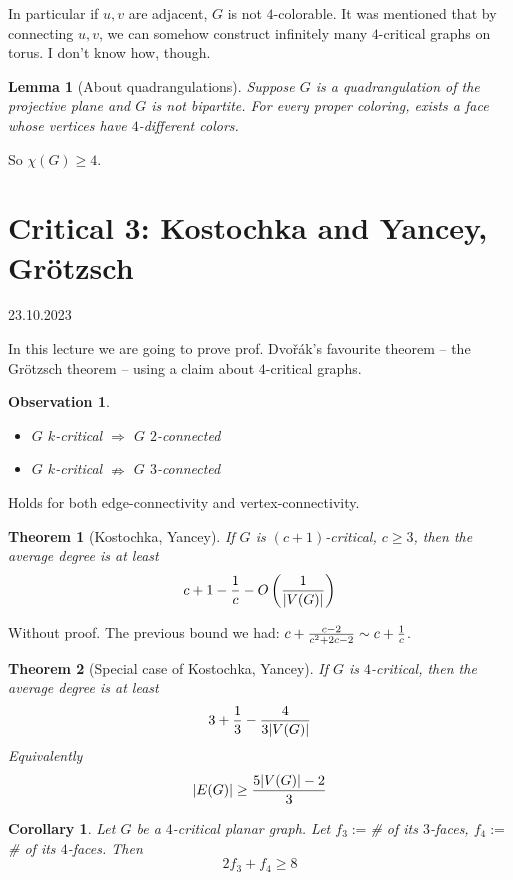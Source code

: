 \documentclass{article}
\newtheorem*{theorem}{Theorem}
\newtheorem*{lemma}{Lemma}
\newtheorem*{observation}{Observation}
\newtheorem*{corollary}{Corollary}
\begin{document}
\noindent
In particular if $u,v$ are adjacent, $G$ is not $4$-colorable. It was mentioned
that by connecting $u,v$, we can somehow construct infinitely many $4$-critical
graphs on torus. I don't know how, though.

\begin{lemma}[About quadrangulations]
	Suppose $G$ is a quadrangulation of the projective plane and $G$ is not
	bipartite. For every proper coloring, exists a face whose vertices have
	$4$-different colors.
\end{lemma}

\noindent
So $\chi(G) \ge 4$.


\newpage
\section{Critical 3: Kostochka and Yancey, Grötzsch} %
23.10.2023

\noindent
In this lecture we are going to prove prof. Dvořák's favourite theorem -- the
Grötzsch theorem -- using a claim about $4$-critical graphs.

\begin{observation}
	~
	\begin{itemize}
		\item $G$ $k$-critical $\Rightarrow$ $G$ $2$-connected
		\item $G$ $k$-critical $\nRightarrow$ $G$ $3$-connected
	\end{itemize}
\end{observation}

\noindent
Holds for both edge-connectivity and vertex-connectivity.

\begin{theorem}[Kostochka, Yancey]
	If $G$ is $(c+1)$-critical, $c \ge 3$, then the average degree is at
	least
	$$c + 1 - {1 \over c} - O \left ( {1 \over {|V(G)|}} \right )$$
\end{theorem}

\noindent
Without proof. The previous bound we had: $c + {{c-2}\over{c^2 + 2c - 2}} \sim
c + {1 \over c}$.

\begin{theorem}[Special case of Kostochka, Yancey]
	If $G$ is $4$-critical, then the average degree is at least
	$$ 3 + {1 \over 3} - {4 \over {3|V(G)|}} $$
	Equivalently
	$$ |E(G)| \ge {{5|V(G)| - 2} \over 3} $$
\end{theorem}

\begin{corollary}
	Let $G$ be a $4$-critical planar graph. Let $f_3 := $\# of its
	$3$-faces, $f_4 := $\# of its $4$-faces. Then
	$$ 2f_3 + f_4 \ge 8 $$
\end{corollary}
\end{document}
